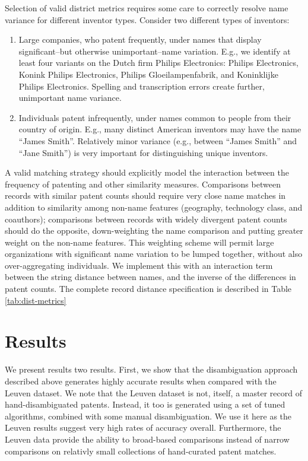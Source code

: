 \documentclass[11pt]{article}
\begin{document}
Selection of valid district metrics requires some care to correctly
resolve name variance for different inventor types. Consider two different types of inventors: 

\begin{enumerate}
\item Large companies, who patent frequently, under names that display
  significant--but otherwise unimportant--name variation. E.g., we
  identify at least four variants on the Dutch firm Philips
  Electronics: Philips Electronics, Konink Philips Electronics, Philips
Gloeilampenfabrik, and Koninklijke Philips Electronics. Spelling and
transcription errors create further, unimportant name variance.
\item Individuals patent infrequently, under names common
  to people from their country of origin. E.g., many distinct American
  inventors may have the name ``James Smith''. Relatively minor
  variance (e.g., between ``James Smith'' and ``Jane Smith'') is very
  important for distinguishing unique inventors.
\end{enumerate}

A valid matching strategy should explicitly model the interaction between
the frequency of patenting and other similarity measures. Comparisons
between records with similar patent counts should require very close name
matches in addition to similarity among non-name features (geography,
technology class, and coauthors); comparisons between records with
widely divergent patent counts should do the opposite, down-weighting
the name comparison and putting greater weight on the non-name
features. This weighting scheme will permit large organizations with
significant name variation to be lumped together, without also
over-aggregating individuals. We implement this with an interaction
term between the string distance between names, and the inverse of the
differences in patent counts. The complete record distance specification
is described in Table \ref{tab:dist-metrics}



\section{Results}
\label{sec:results}


We present results two results. First, we show that the disambiguation
approach described above generates highly accurate results when
compared with the Leuven dataset. We note that the Leuven dataset is
not, itself, a master record of hand-disambiguated patents. Instead,
it too is generated using a set of tuned algorithms, combined with
some manual disambiguation. We use it here as the Leuven results
suggest very high rates of accuracy overall. Furthermore, the Leuven
data provide the ability to broad-based comparisons instead of narrow
comparisons on relativly small collections of hand-curated patent
matches.
\end{document}
